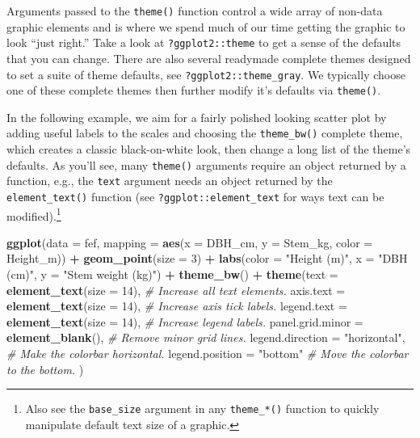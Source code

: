 \documentclass[
  11pt,
]{krantz}
\newenvironment{Shaded}{\begin{snugshade}}{\end{snugshade}}
\newcommand{\CommentTok}[1]{\textcolor[rgb]{0.56,0.35,0.01}{\textit{#1}}}
\newcommand{\DataTypeTok}[1]{\textcolor[rgb]{0.13,0.29,0.53}{#1}}
\newcommand{\DecValTok}[1]{\textcolor[rgb]{0.00,0.00,0.81}{#1}}
\newcommand{\KeywordTok}[1]{\textcolor[rgb]{0.13,0.29,0.53}{\textbf{#1}}}
\newcommand{\NormalTok}[1]{#1}
\newcommand{\OperatorTok}[1]{\textcolor[rgb]{0.81,0.36,0.00}{\textbf{#1}}}
\newcommand{\StringTok}[1]{\textcolor[rgb]{0.31,0.60,0.02}{#1}}
\theoremstyle{definition}
\theoremstyle{definition}
\theoremstyle{definition}
\theoremstyle{definition}
\theoremstyle{remark}
\begin{document}
Arguments passed to the \texttt{theme()} function control a wide array of non-data graphic elements and is where we spend much of our time getting the graphic to look ``just right.'' Take a look at \texttt{?ggplot2::theme} to get a sense of the defaults that you can change. There are also several readymade complete themes designed to set a suite of theme defaults, see \texttt{?ggplot2::theme\_gray}. We typically choose one of these complete themes then further modify it's defaults via \texttt{theme()}.

In the following example, we aim for a fairly polished looking scatter plot by adding useful labels to the scales and choosing the \texttt{theme\_bw()} complete theme, which creates a classic black-on-white look, then change a long list of the theme's defaults. As you'll see, many \texttt{theme()} arguments require an object returned by a function, e.g., the \texttt{text} argument needs an object returned by the \texttt{element\_text()} function (see \texttt{?ggplot::element\_text} for ways text can be modified).\footnote{Also see the \texttt{base\_size} argument in any \texttt{theme\_*()} function to quickly manipulate default text size of a graphic.}

\begin{Shaded}
\begin{Highlighting}[]
\KeywordTok{ggplot}\NormalTok{(}\DataTypeTok{data =}\NormalTok{ fef, }
       \DataTypeTok{mapping =} \KeywordTok{aes}\NormalTok{(}\DataTypeTok{x =}\NormalTok{ DBH\_cm, }\DataTypeTok{y =}\NormalTok{ Stem\_kg, }\DataTypeTok{color =}\NormalTok{ Height\_m)) }\OperatorTok{+}
\StringTok{  }\KeywordTok{geom\_point}\NormalTok{(}\DataTypeTok{size =} \DecValTok{3}\NormalTok{) }\OperatorTok{+}\StringTok{ }
\StringTok{  }\KeywordTok{labs}\NormalTok{(}\DataTypeTok{color =} \StringTok{"Height (m)"}\NormalTok{, }\DataTypeTok{x =} \StringTok{"DBH (cm)"}\NormalTok{, }\DataTypeTok{y =} \StringTok{"Stem weight (kg)"}\NormalTok{) }\OperatorTok{+}
\StringTok{  }\KeywordTok{theme\_bw}\NormalTok{() }\OperatorTok{+}
\StringTok{  }\KeywordTok{theme}\NormalTok{(}\DataTypeTok{text =} \KeywordTok{element\_text}\NormalTok{(}\DataTypeTok{size =} \DecValTok{14}\NormalTok{), }\CommentTok{\# Increase all text elements.}
        \DataTypeTok{axis.text =} \KeywordTok{element\_text}\NormalTok{(}\DataTypeTok{size =} \DecValTok{14}\NormalTok{), }\CommentTok{\# Increase axis tick labels.}
        \DataTypeTok{legend.text =} \KeywordTok{element\_text}\NormalTok{(}\DataTypeTok{size =} \DecValTok{14}\NormalTok{), }\CommentTok{\# Increase legend labels.}
        \DataTypeTok{panel.grid.minor =} \KeywordTok{element\_blank}\NormalTok{(), }\CommentTok{\# Remove minor grid lines.}
        \DataTypeTok{legend.direction =} \StringTok{"horizontal"}\NormalTok{, }\CommentTok{\# Make the colorbar horizontal.}
        \DataTypeTok{legend.position =} \StringTok{"bottom"} \CommentTok{\# Move the colorbar to the bottom.}
\NormalTok{        ) }
\end{Highlighting}
\end{Shaded}
\end{document}
